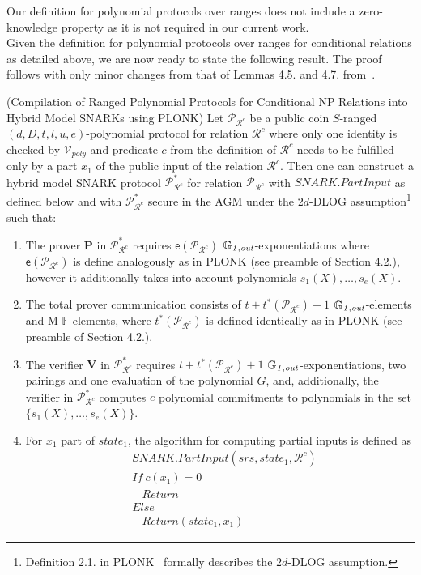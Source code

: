 \noindent Our definition for polynomial protocols over ranges does not include a zero-knowledge property as it is not required in our current work. \\

\noindent Given the definition for polynomial protocols over ranges for conditional relations as detailed above, we are now ready to state the following result.
The proof follows with only minor changes from that of Lemmas 4.5. and 4.7. from~\cite{plonk}. 

\begin{lemma}(Compilation of Ranged Polynomial Protocols for Conditional NP Relations into Hybrid Model SNARKs using PLONK) 
\label{le:compilation_step_1}
Let $\mathscr{P}_{\mathcal{R}^c}$ be a public coin $S$-ranged $(d, D, t, l, u, e)$-polynomial protocol for relation $\mathcal{R}^c$ where only 
one identity is checked by $\mathcal{V}_{poly}$ and predicate $c$ from the definition of ${\mathcal{R}^c}$ needs to be fulfilled only by a part $x_1$ 
of the public input of the relation ${\mathcal{R}^c}$. Then one can construct a hybrid model SNARK protocol $\mathscr{P}^*_{\mathcal{R}^c}$ for relation 
$\mathscr{P}_{\mathcal{R}^c}$ with $\mathit{SNARK.PartInput}$ as defined below 
and with $\mathscr{P}^*_{\mathcal{R}^c}$ secure in the AGM under the $2d$-DLOG 
assumption\footnote{Definition 2.1. in PLONK~\cite{plonk} formally describes the $2d$-DLOG assumption.} such that:
\begin{enumerate}
\item The prover $\mathbf{P}$ in $\mathscr{P}^*_{\mathcal{R}^c}$ requires $\mathsf{e}(\mathscr{P}_{\mathcal{R}^c})$ $\mathbb{G}_{\mathit{1,out}}$-exponentiations where 
$\mathsf{e}(\mathscr{P}_{\mathcal{R}^c})$ is define analogously as in PLONK (see preamble of Section 4.2.), however it additionally takes into account 
polynomials $s_1(X), \ldots, s_e(X)$. 
\item The total prover communication consists of $t + t^*(\mathscr{P}_{\mathcal{R}^c}) + 1$ $\mathbb{G}_{\mathit{1,out}}$-elements and M $\mathbb{F}$-elements, where 
$t^*(\mathscr{P}_{\mathcal{R}^c})$ is defined identically as in PLONK (see preamble of Section 4.2.).
\item The verifier $\mathbf{V}$ in $\mathscr{P}^*_{\mathcal{R}^c}$ requires $t + t^*(\mathscr{P}_{\mathcal{R}^c})+1$ $\mathbb{G}_{\mathit{1,out}}$-exponentiations, 
two pairings and one evaluation of the polynomial $G$, and, additionally, the verifier in $\mathscr{P}^*_{\mathcal{R}^c}$ computes $e$ 
polynomial commitments to polynomials in the set $\{s_1(X), \ldots, s_e(X)\}$. 
\item For $x_1$ part of  $\mathit{state_1}$, the algorithm for computing partial inputs is defined as 
\begin{align*}
&\mathit{SNARK.PartInput}(\mathit{srs}, \mathit{state_1}, \mathcal{R}^c) \\
&\mathit{If \ } c(x_1) = 0 \\
&\ \ \ \ \mathit{Return} \\
&\mathit{Else } \\
&\ \ \ \ \mathit{Return} (\mathit{state_1}, x_1)
\end{align*}
\end{enumerate}
\end{lemma}